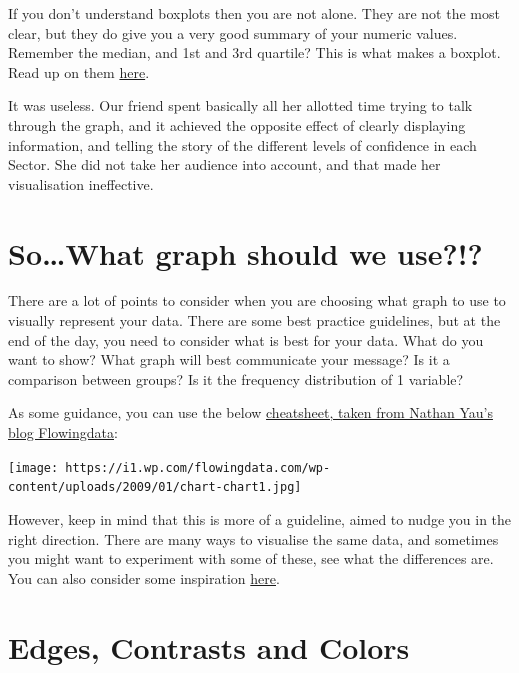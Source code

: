 \documentclass[
]{book}
\begin{document}
If you don't understand boxplots then you are not alone. They are not the most clear, but they do give you a very good summary of your numeric values. Remember the median, and 1st and 3rd quartile? This is what makes a boxplot. Read up on them \href{https://en.wikipedia.org/wiki/Box_plot}{here}.

It was useless. Our friend spent basically all her allotted time trying to talk through the graph, and it achieved the opposite effect of clearly displaying information, and telling the story of the different levels of confidence in each Sector. She did not take her audience into account, and that made her visualisation ineffective.

\hypertarget{sowhat-graph-should-we-use}{%
\section{So\ldots What graph should we use?!?}\label{sowhat-graph-should-we-use}}

There are a lot of points to consider when you are choosing what graph to use to visually represent your data. There are some best practice guidelines, but at the end of the day, you need to consider what is best for your data. What do you want to show? What graph will best communicate your message? Is it a comparison between groups? Is it the frequency distribution of 1 variable?

As some guidance, you can use the below \href{https://flowingdata.com/2009/01/15/flow-chart-shows-you-what-chart-to-use/}{cheatsheet, taken from Nathan Yau's blog Flowingdata}:

\texttt{[image: https://i1.wp.com/flowingdata.com/wp-content/uploads/2009/01/chart-chart1.jpg]}

However, keep in mind that this is more of a guideline, aimed to nudge you in the right direction. There are many ways to visualise the same data, and sometimes you might want to experiment with some of these, see what the differences are. You can also consider some inspiration \href{http://datavizproject.com/}{here}.

\hypertarget{edges-contrasts-and-colors}{%
\section{Edges, Contrasts and Colors}\label{edges-contrasts-and-colors}}
\end{document}
